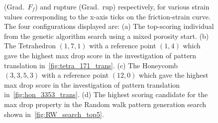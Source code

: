 \begin{figure}[!htb]
{  (Grad.\ $F_f$) and rupture (Grad.\ rup) respectively, for various strain values
  corresponding to the x-axis ticks on the friction-strain curve. The four
  configurations displayed are: (a) The top-scoring individual from the genetic
  algorithm search using a mixed porosity start. (b) The Tetrahedron $(1,7,1)$
  with a reference point $(1,4)$ which gave the highest max drop score in the
  investigation of pattern translation in~\cref{fig:tetra_171_trans}. (c) The
  Honeycomb $(3,3,5,3)$ with a reference point $(12,0)$ which gave the highest
  max drop score in the investigation of pattern translation
  in~\cref{fig:hon_3353_trans}. (d) The highest scoring candidate for the max drop property in the Random walk pattern generation search shown in~\cref{fig:RW_search_top5}. }
  \label{fig:grad_cam}
\end{figure}








